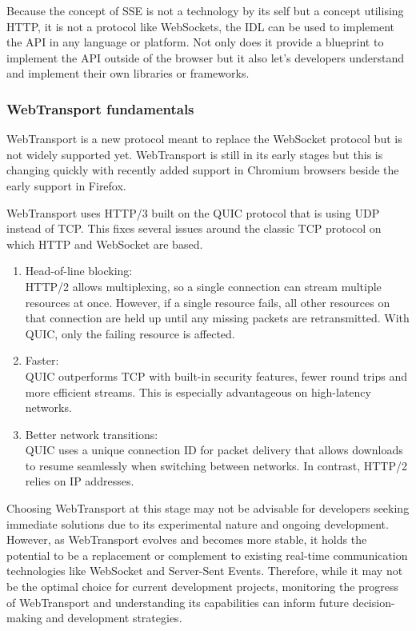 Because the concept of SSE is not a technology by its self but a concept utilising HTTP, it is not a protocol like WebSockets, the IDL can be used to implement the API in any language or platform. Not only does it provide a blueprint to implement the API outside of the browser but it also let's developers understand and implement their own libraries or frameworks.

\subsubsection{WebTransport fundamentals}

WebTransport is a new protocol meant to replace the WebSocket protocol but is not widely supported yet. WebTransport is still in its early stages but this is changing quickly with recently added support in Chromium browsers beside the early support in Firefox.

WebTransport uses HTTP/3 built on the QUIC protocol that is using UDP instead of TCP. This fixes several issues around the classic TCP protocol on which HTTP and WebSocket are based. \cite{w3-wt}

\begin{enumerate}
  \item Head-of-line blocking: \\ HTTP/2 allows multiplexing, so a single connection can stream multiple resources at once. However, if a single resource fails, all other resources on that connection are held up until any missing packets are retransmitted. With QUIC, only the failing resource is affected.
  \item Faster: \\ QUIC outperforms TCP with built-in security features, fewer round trips and more efficient streams. This is especially advantageous on high-latency networks.
  \item Better network transitions: \\ QUIC uses a unique connection ID for packet delivery that allows downloads to resume seamlessly when switching between networks. In contrast, HTTP/2 relies on IP addresses.
\end{enumerate}

Choosing WebTransport at this stage may not be advisable for developers seeking immediate solutions due to its experimental nature and ongoing development. However, as WebTransport evolves and becomes more stable, it holds the potential to be a replacement or complement to existing real-time communication technologies like WebSocket and Server-Sent Events. Therefore, while it may not be the optimal choice for current development projects, monitoring the progress of WebTransport and understanding its capabilities can inform future decision-making and development strategies.

